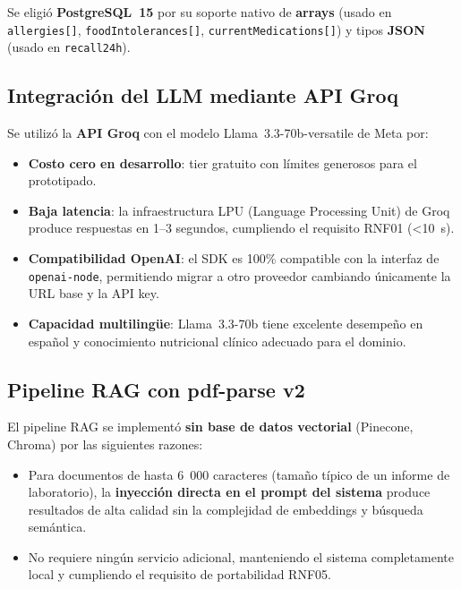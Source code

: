 \documentclass[12pt,a4paper]{article}
\begin{document}
Se eligió \textbf{PostgreSQL~15} por su soporte nativo de \textbf{arrays} (usado en
\texttt{allergies[]}, \texttt{foodIntolerances[]}, \texttt{currentMedications[]})
y tipos \textbf{JSON} (usado en \texttt{recall24h}).

\subsection{Integración del LLM mediante API Groq}

Se utilizó la \textbf{API Groq} con el modelo Llama~3.3-70b-versatile de Meta por:

\begin{itemize}[leftmargin=1.5em]
  \item \textbf{Costo cero en desarrollo}: tier gratuito con límites generosos para
        el prototipado.
  \item \textbf{Baja latencia}: la infraestructura LPU (Language Processing Unit) de
        Groq produce respuestas en 1--3 segundos, cumpliendo el requisito RNF01
        (\textless{}10~s).
  \item \textbf{Compatibilidad OpenAI}: el SDK es 100\% compatible con la interfaz
        de \texttt{openai-node}, permitiendo migrar a otro proveedor cambiando
        únicamente la URL base y la API key.
  \item \textbf{Capacidad multilingüe}: Llama~3.3-70b tiene excelente desempeño en
        español y conocimiento nutricional clínico adecuado para el dominio.
\end{itemize}

\subsection{Pipeline RAG con pdf-parse v2}

El pipeline RAG se implementó \textbf{sin base de datos vectorial} (Pinecone, Chroma)
por las siguientes razones:

\begin{itemize}[leftmargin=1.5em]
  \item Para documentos de hasta 6~000 caracteres (tamaño típico de un informe de
        laboratorio), la \textbf{inyección directa en el prompt del sistema} produce
        resultados de alta calidad sin la complejidad de embeddings y búsqueda
        semántica.
  \item No requiere ningún servicio adicional, manteniendo el sistema completamente
        local y cumpliendo el requisito de portabilidad RNF05.
\end{itemize}
\end{document}
